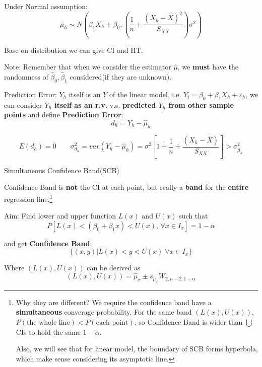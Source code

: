     Under Normal assumption:
    \[
        \hat{\mu}_h\sim N(\beta _1X_h+\beta _0,\left( \dfrac{1}{n}+\dfrac{(X_h-\bar{X})^2}{S_{XX}} \right)\sigma^2) 
    \]
    
    Base on distribution we can give CI and HT.

    Note: Remember that when we consider the estimator $ \hat{\mu } $, we \textbf{must } have the randomness of $ \hat{\beta }_0,\hat{\beta }_1 $ considered(if they are unknown).
    
    Prediction Error: $ Y_h $ itself is an $ Y $ of the linear model, i.e. $ Y_i=\beta_0+\beta_1X_h+\varepsilon _h $, we can consider \textbf{$ Y_h $ itself as an r.v. }v.s.\textbf{ predicted $ Y_h $ from other sample points} and define \textbf{Prediction Error}: 
    \[
        d_h=Y_h-\hat{\mu}_h 
    \]

    
    \[
        E(d_h)=0\qquad \sigma^2_{d_h}=var(Y_h-\hat{\mu }_h)=\sigma^2\left[ 1+\dfrac{1}{n}+\dfrac{(X_h-\bar{X})}{S_{XX}} \right] > \sigma ^2_{\hat{\mu}_h}
    \]
    


    \begin{point}
       Simultaneous Confidence Band(SCB)
    \end{point}

    Confidence Band is \textbf{not} the CI at each point, but really a \textbf{band} for the \textbf{entire} regression line.\footnote{Why they are different? We require the confidence band have a \textbf{simultaneous} converage probability. For the same band $ (L(x),U(x)) $, $ P(\text{the whole line})< P(\text{each point})$, so Confidence Band is wider than $ \bigcup $CIs to hold the same $ 1-\alpha $.
    
    Also, we will see that for linear model, the boundary of SCB forms hyperbola, which make sense considering its asymptotic line.}
    
    
    Aim: Find lower and upper function $ L(x) $ and $ U(x) $ such that
    \[
        P[L(x)<(\beta _0+\beta _1x)<U(x),\,\forall x\in I_x]=1-\alpha  
    \]
    
    and get \textbf{Confidence Band}:
    \[
        \{(x,y)|L(x)<y<U(x)|\forall x\in I_x\} 
    \]
    

    Where $ (L(x),U(x)) $ can be derived as
    \[
        (L(x),U(x))=\hat{\mu}_x\pm s_{\hat{\mu}_x}W_{2,n-2,1-\alpha}
    \]

